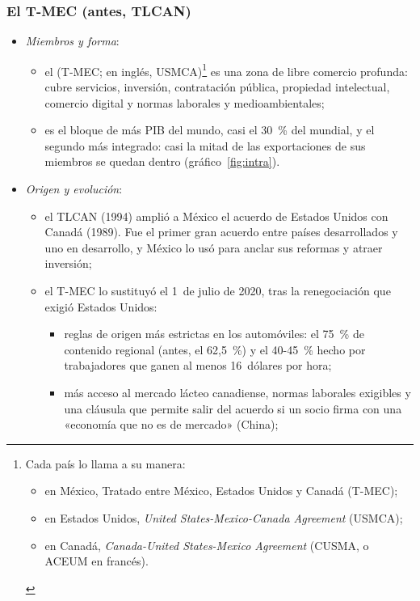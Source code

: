 \documentclass[11pt]{article}
\begin{document}
\subsubsection{El T-MEC (antes, TLCAN)}\label{sec:tmec}

\begin{itemize}
\item \emph{Miembros y forma}:
  \begin{itemize}
  \item el  (T-MEC; en inglés, USMCA)\footnote{Cada país lo llama a su manera:
\begin{itemize}
\item en México, Tratado entre México, Estados Unidos y Canadá (T-MEC);
\item en Estados Unidos, \emph{United States-Mexico-Canada Agreement} (USMCA);
\item en Canadá, \emph{Canada-United States-Mexico Agreement} (CUSMA, o ACEUM en francés).
\end{itemize}} es una zona de libre comercio profunda: cubre servicios, inversión, contratación pública, propiedad intelectual, comercio digital y normas laborales y medioambientales;
  \item es el bloque de más PIB del mundo, casi el 30~\% del mundial, y el segundo más integrado: casi la mitad de las exportaciones de sus miembros se quedan dentro (gráfico~\ref{fig:intra}).
  \end{itemize}
\item \emph{Origen y evolución}:
  \begin{itemize}
  \item el TLCAN (1994) amplió a México el acuerdo de Estados Unidos con Canadá (1989). Fue el primer gran acuerdo entre países desarrollados y uno en desarrollo, y México lo usó para anclar sus reformas y atraer inversión;
  \item el T-MEC lo sustituyó el 1~de julio de 2020, tras la renegociación que exigió Estados Unidos:
    \begin{itemize}
    \item reglas de origen más estrictas en los automóviles: el 75~\% de contenido regional (antes, el 62,5~\%) y el 40-45~\% hecho por trabajadores que ganen al menos 16~dólares por hora;
    \item más acceso al mercado lácteo canadiense, normas laborales exigibles y una cláusula que permite salir del acuerdo si un socio firma con una «economía que no es de mercado» (China);

\end{itemize}
\end{itemize}
\end{itemize}
\end{document}

